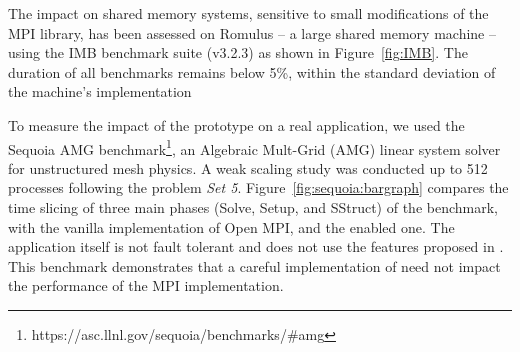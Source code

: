 The impact on shared memory systems, sensitive to small modifications of
the MPI library, has been assessed on Romulus -- a large shared memory 
machine -- using the IMB benchmark suite (v3.2.3) as shown in 
Figure~\ref{fig:IMB}. The duration of all benchmarks remains below 5\%, 
within the standard deviation of the machine's implementation

To measure the impact of the prototype on a real application, we used the
Sequoia AMG benchmark\footnote{https://asc.llnl.gov/sequoia/benchmarks/\#amg}, 
an Algebraic Mult-Grid (AMG) linear system
solver for unstructured mesh physics. A weak scaling study was conducted up to
512 processes following the problem \emph{Set 5}.
Figure~\ref{fig:sequoia:bargraph} compares the time slicing of three main
phases (Solve, Setup, and SStruct) of the benchmark, with the
vanilla implementation of Open MPI, and the \ulfm enabled one. The
application itself is not fault tolerant and does not use the features proposed
in \ulfm. This benchmark demonstrates that a careful
implementation of \ulfm need not impact the performance of the
MPI implementation.
